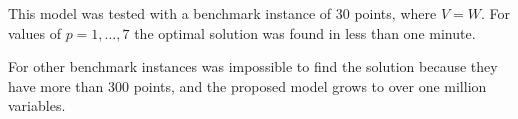 \begin{frame}
  This model was tested with a benchmark instance of 30 points, 
  where $V = W$.
  For values of $p = 1,\ldots,7$ the optimal solution was found in less than one minute.

  For other benchmark instances was impossible to find the solution
  because they have more than 300 points, and the proposed model grows to over one million variables.
\end{frame}

